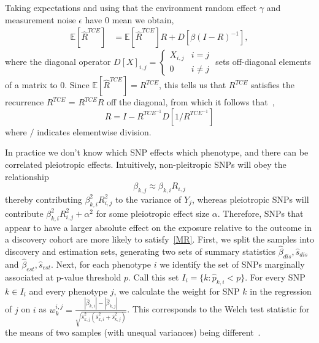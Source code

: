 \documentclass{article}
\begin{document}
Taking expectations and using that the environment random effect $\gamma$ and measurement noise $\epsilon$ have 0 mean we obtain,
\begin{align*}
\mathbb{E}[\hat{R}^{TCE}]  &= \mathbb{E}[\hat{R}^{TCE}] R + D[\beta (I-R)^{-1}],
\end{align*}
where the diagonal operator $D[X]_{i,j} = \left\{ \begin{array}{ll}
  X_{i,j} & i=j \\ 0 & i \neq j \end{array} \right.$ sets off-diagonal elements
  of a matrix to 0.
  Since $\mathbb{E}[\hat{R}^{TCE}] =R^{TCE}$,
this tells us that $R^{TCE}$ satisfies the recurrence
  $R^{TCE}$ = $R^{TCE} R$ off the diagonal, from
  which it follows that~\cite{Pachter},
\begin{equation}\label{r_cde}
R = I - R^{TCE^{-1}} D[1 / R^{TCE^{-1}}]
\end{equation}
where $/$ indicates elementwise division.

In practice we don't know which SNP effects which phenotype,
and there can be correlated pleiotropic effects.
Intuitively, non-pleitropic SNPs will obey the relationship
\begin{equation}\label{MR}
\beta_{k,j} \approx \beta_{k,i} R_{i,j}
\end{equation}
thereby contributing
$\beta_{k, i}^2 R_{i, j}^2$ to the variance of $Y_j$, whereas
pleiotropic SNPs will contribute $\beta_{k, i}^2 R_{i, j}^2 + \alpha^2$
for some pleiotropic effect size $\alpha$. Therefore, SNPs that appear to
have a larger absolute effect on the exposure relative to the outcome in a discovery 
cohort are more likely to satisfy~\eqref{MR}.
 First, we split the samples
 into discovery and estimation sets, generating
two sets of summary statistics $\hat{\beta}_{dis}, \hat{s}_{dis}$ and
$\hat{\beta}_{est}, \hat{s}_{est}$. Next, for each
phenotype $i$ we identify the set of SNPs marginally associated at p-value threshold $p$.
Call this set $I_i = \{k: \hat{p}_{k, i} < p\}$. For every SNP $k \in I_i$ and
every phenotype $j$, we calculate the  weight for SNP $k$ in the regression of $j$ on $i$ as
$w^{i,j}_k = \frac{|\hat{\beta}_{k, i}| - |\hat{\beta}_{k, j}|}
  {\sqrt{\hat{s}_{k,j}^2 (\hat{s}^2_{k, i} + \hat{s}^2_{k, j})}}$. This corresponds to the Welch test statistic for the means of two samples (with unequal variances) being different~\cite{Welch1947}.
  
\end{document}

